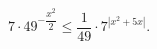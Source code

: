 \begin{ex}[type=inequality]
	\begin{condition}
		$7\cdot49$\tiny$^{-\dfrac{x^2}{2}}$\normalsize$\leqslant\dfrac{1}{49}\cdot7^{|x^2 + 5x|} .$
	\end{condition}
\end{ex}